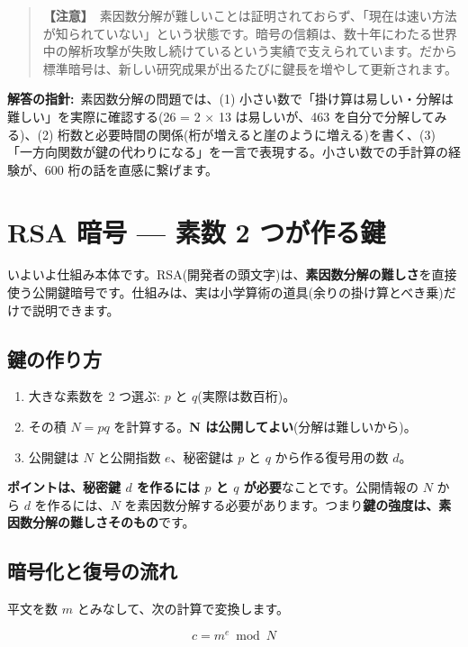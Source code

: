 \documentclass{article}
\begin{document}
\begin{quote}
\textbf{【注意】}\ 素因数分解が難しいことは証明されておらず、「現在は速い方法が知られていない」という状態です。暗号の信頼は、数十年にわたる世界中の解析攻撃が失敗し続けているという実績で支えられています。だから標準暗号は、新しい研究成果が出るたびに鍵長を増やして更新されます。
\end{quote}

\textbf{解答の指針:}\ 素因数分解の問題では、(1) 小さい数で「掛け算は易しい・分解は難しい」を実際に確認する(26 = 2 × 13 は易しいが、463 を自分で分解してみる)、(2) 桁数と必要時間の関係(桁が増えると崖のように増える)を書く、(3) 「一方向関数が鍵の代わりになる」を一言で表現する。小さい数での手計算の経験が、600 桁の話を直感に繋げます。

\section{RSA 暗号 — 素数 2 つが作る鍵}

いよいよ仕組み本体です。RSA(開発者の頭文字)は、\textbf{素因数分解の難しさ}を直接使う公開鍵暗号です。仕組みは、実は小学算術の道具(余りの掛け算とべき乗)だけで説明できます。

\subsection{鍵の作り方}

\begin{enumerate}
\item 大きな素数を 2 つ選ぶ: \( p \) と \( q \)(実際は数百桁)。
\item その積 \( N = pq \) を計算する。\textbf{N は公開してよい}(分解は難しいから)。
\item 公開鍵は \( N \) と公開指数 \( e \)、秘密鍵は \( p \) と \( q \) から作る復号用の数 \( d \)。
\end{enumerate}

\textbf{ポイントは、秘密鍵 \( d \) を作るには \( p \) と \( q \) が必要}なことです。公開情報の \( N \) から \( d \) を作るには、\( N \) を素因数分解する必要があります。つまり\textbf{鍵の強度は、素因数分解の難しさそのもの}です。

\subsection{暗号化と復号の流れ}

平文を数 \( m \) とみなして、次の計算で変換します。

\[ c = m^{e} \bmod N \]
\end{document}
